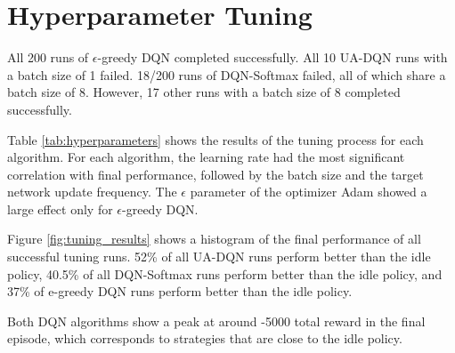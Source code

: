 \section{Hyperparameter Tuning}
All 200 runs of $\epsilon$-greedy DQN completed successfully.
All 10 UA-DQN runs with a batch size of 1 failed.
18/200 runs of DQN-Softmax failed, all of which share a batch size of 8.
However, 17 other runs with a batch size of 8 completed successfully.

Table \ref{tab:hyperparameters} shows the results of the tuning process for each algorithm.
For each algorithm, the learning rate had the most significant correlation with final performance, followed by the batch size and the target network update frequency.
The $\epsilon$ parameter of the optimizer Adam showed a large effect only for $\epsilon$-greedy DQN.

Figure \ref{fig:tuning_results} shows a histogram of the final performance of all successful tuning runs.
52\% of all UA-DQN runs perform better than the idle policy, 40.5\% of all DQN-Softmax  runs perform better than the idle policy, and 37\% of e-greedy DQN runs perform better than the idle policy.

Both DQN algorithms show a peak at around -5000 total reward in the final episode, which corresponds to strategies that are close to the idle policy.

